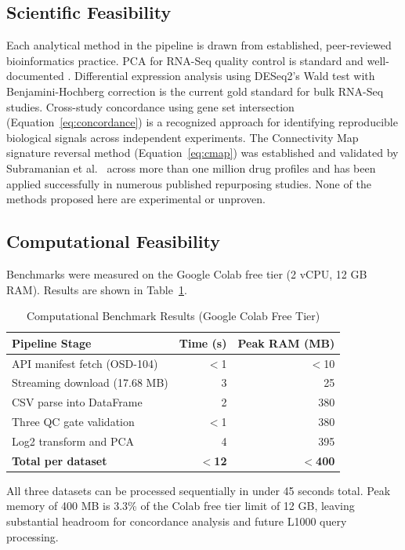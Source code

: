 \documentclass[conference]{IEEEtran}
\begin{document}
\subsection{Scientific Feasibility}
Each analytical method in the pipeline is drawn from established, peer-reviewed bioinformatics practice. PCA for RNA-Seq quality control is standard and well-documented \cite{parafati2023}. Differential expression analysis using DESeq2's Wald test with Benjamini-Hochberg correction is the current gold standard for bulk RNA-Seq studies. Cross-study concordance using gene set intersection (Equation~\ref{eq:concordance}) is a recognized approach for identifying reproducible biological signals across independent experiments. The Connectivity Map signature reversal method (Equation~\ref{eq:cmap}) was established and validated by Subramanian et al.~\cite{subramanian2017} across more than one million drug profiles and has been applied successfully in numerous published repurposing studies. None of the methods proposed here are experimental or unproven.

\subsection{Computational Feasibility}
Benchmarks were measured on the Google Colab free tier (2 vCPU, 12 GB RAM). Results are shown in Table~\ref{tab:bench}.

\begin{table}[!t]
\centering
\caption{Computational Benchmark Results (Google Colab Free Tier)}
\label{tab:bench}
\begin{tabular}{lrr}
\toprule
\textbf{Pipeline Stage} & \textbf{Time (s)} & \textbf{Peak RAM (MB)} \\
\midrule
API manifest fetch (OSD-104) & $<$1 & $<$10 \\
Streaming download (17.68 MB) & 3 & 25 \\
CSV parse into DataFrame & 2 & 380 \\
Three QC gate validation & $<$1 & 380 \\
Log2 transform and PCA & 4 & 395 \\
\midrule
\textbf{Total per dataset} & \textbf{$<$12} & \textbf{$<$400} \\
\bottomrule
\end{tabular}
\end{table}

All three datasets can be processed sequentially in under 45 seconds total. Peak memory of 400 MB is 3.3\% of the Colab free tier limit of 12 GB, leaving substantial headroom for concordance analysis and future L1000 query processing.
\end{document}
